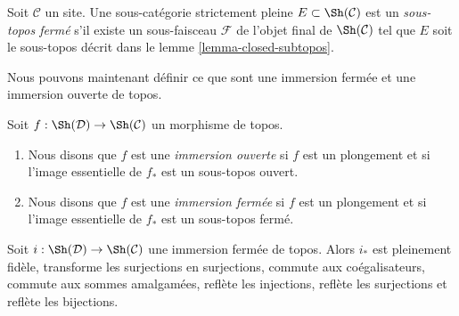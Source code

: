 \begin{definition}
\label{definition-closed-subtopos}
Soit $\mathcal{C}$ un site. Une sous-catégorie strictement pleine
$E \subset \Sh(\mathcal{C})$ est un {\it sous-topos fermé}
s'il existe un sous-faisceau $\mathcal{F}$ de l'objet final
de $\Sh(\mathcal{C})$ tel que $E$ soit le sous-topos
décrit dans le lemme \ref{lemma-closed-subtopos}.
\end{definition}

\noindent
Nous pouvons maintenant définir ce que sont une immersion fermée
et une immersion ouverte de topos.

\begin{definition}
\label{definition-immersion-topoi}
Soit $f : \Sh(\mathcal{D}) \to \Sh(\mathcal{C})$ un morphisme de topos.
\begin{enumerate}
\item Nous disons que $f$ est une {\it immersion ouverte} si $f$ est un plongement
et si l'image essentielle de $f_*$ est un sous-topos ouvert.
\item Nous disons que $f$ est une {\it immersion fermée} si $f$ est un plongement
et si l'image essentielle de $f_*$ est un sous-topos fermé.
\end{enumerate}
\end{definition}

\begin{lemma}
\label{lemma-closed-immersion}
Soit $i : \Sh(\mathcal{D}) \to \Sh(\mathcal{C})$ une immersion fermée de
topos. Alors $i_*$ est pleinement fidèle, transforme les surjections en surjections,
commute aux coégalisateurs, commute aux sommes amalgamées, reflète les injections,
reflète les surjections et reflète les bijections.
\end{lemma}


